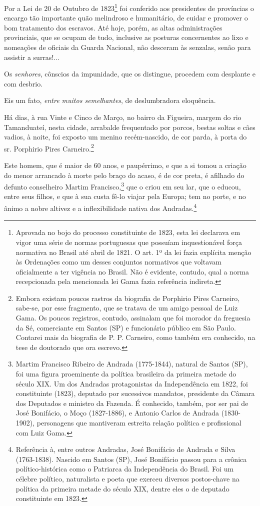 Por a Lei de 20 de Outubro de 1823\footnote{Aprovada no bojo do
  processo constituinte de 1823, esta lei declarava em vigor uma série
  de normas portuguesas que possuíam inquestionável força normativa no
  Brasil até abril de 1821. O art. 1º da lei fazia explícita menção às
  Ordenações como um desses conjuntos normativos que voltavam
  oficialmente a ter vigência no Brasil. Não é evidente, contudo, qual a
  norma recepcionada pela mencionada lei Gama fazia referência indireta.}
foi conferido aos presidentes de províncias o encargo tão importante
quão melindroso e humanitário, de cuidar e promover o bom tratamento dos
escravos. Até hoje, porém, as altas administrações provinciais, que se
ocupam de tudo, inclusive as posturas concernentes ao lixo e nomeações
de oficiais da Guarda Nacional, não desceram às senzalas, senão para
assistir a surras!...

Os \emph{senhores}, cônscios da impunidade, que os distingue, procedem
com desplante e com desbrio.

Eis um fato, \emph{entre muitos semelhantes}, de deslumbradora
eloquência.

Há dias, à rua Vinte e Cinco de Março, no bairro da Figueira, margem do
rio Tamanduateí, nesta cidade, arrabalde frequentado por porcos, bestas
soltas e cães vadios, à noite, foi exposto um menino recém-nascido, de
cor parda, à porta do sr. Porphirio Pires Carneiro.\footnote{Embora
  existam poucos rastros da biografia de Porphirio Pires Carneiro,
  sabe-se, por esse fragmento, que se tratava de um amigo pessoal de
  Luiz Gama. Os poucos registros, contudo, assinalam que foi morador da
  freguesia da Sé, comerciante em Santos (SP) e funcionário público em
  São Paulo. Contarei mais da biografia de P. P. Carneiro, como também
  era conhecido, na tese de doutorado que ora escrevo.}

Este homem, que é maior de 60 anos, e paupérrimo, e que a si tomou a
criação do menor arrancado à morte pelo braço do acaso, é de cor preta,
é afilhado do defunto conselheiro Martim Francisco,\footnote{Martim
  Francisco Ribeiro de Andrada (1775-1844), natural de Santos (SP), foi
  uma figura proeminente da política brasileira da primeira metade do
  século XIX. Um dos Andradas protagonistas da Independência em 1822,
  foi constituinte (1823), deputado por sucessivos mandatos, presidente
  da Câmara dos Deputados e ministro da Fazenda. É conhecido, também,
  por ser pai de José Bonifácio, o Moço (1827-1886), e Antonio Carlos de
  Andrada (1830-1902), personagens que mantiveram estreita relação
  política e profissional com Luiz Gama.} que o criou em seu lar, que o
educou, entre seus filhos, e que à sua custa fê-lo viajar pela Europa;
tem no porte, e no ânimo a nobre altivez e a inflexibilidade nativa dos
Andradas.\footnote{Referência à, entre outros Andradas, José Bonifácio
  de Andrada e Silva (1763-1838). Nascido em Santos (SP), José Bonifácio
  passou para a crônica político-histórica como o Patriarca da
  Independência do Brasil. Foi um célebre político, naturalista e poeta
  que exerceu diversos postos-chave na política da primeira metade do
  século XIX, dentre eles o de deputado constituinte em 1823.}

